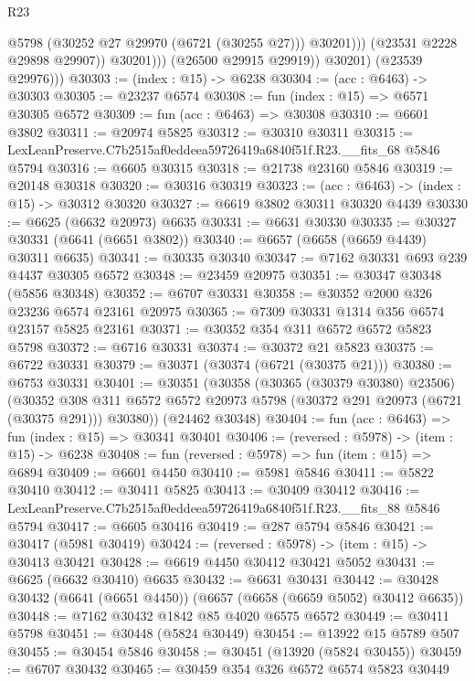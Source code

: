 \begin{lexlean}{R23}
\begin{coremodule}
                          @5798
                          (@30252 @27 @29970 (@6721 (@30255 @27)))
                          @30201)))
                    (@23531 @2228 @29898 @29907))
                  @30201)))
            (@26500 @29915 @29919))
          @30201)
        (@23539 @29976)))
@30303 := (index : @15) -> @6238
@30304 := (acc : @6463) -> @30303
@30305 := @23237 @6574
@30308 := fun (index : @15) => @6571 @30305 @6572
@30309 := fun (acc : @6463) => @30308
@30310 := @6601 @3802
@30311 := @20974 @5825
@30312 := @30310 @30311
@30315 := LexLeanPreserve.C7b2515af0eddeea59726419a6840f51f.R23.__fits_68 @5846 @5794
@30316 := @6605 @30315
@30318 := @21738 @23160 @5846
@30319 := @20148 @30318
@30320 := @30316 @30319
@30323 := (acc : @6463) -> (index : @15) -> @30312 @30320
@30327 := @6619 @3802 @30311 @30320 @4439
@30330 := @6625 (@6632 @20973) @6635
@30331 := @6631 @30330
@30335 := @30327 @30331 (@6641 (@6651 @3802))
@30340 := @6657 (@6658 (@6659 @4439) @30311 @6635)
@30341 := @30335 @30340
@30347 := @7162 @30331 @693 @239 @4437 @30305 @6572
@30348 := @23459 @20975
@30351 := @30347 @30348 (@5856 @30348)
@30352 := @6707 @30331
@30358 := @30352 @2000 @326 @23236 @6574 @23161 @20975
@30365 := @7309 @30331 @1314 @356 @6574 @23157 @5825 @23161
@30371 := @30352 @354 @311 @6572 @6572 @5823 @5798
@30372 := @6716 @30331
@30374 := @30372 @21 @5823
@30375 := @6722 @30331
@30379 := @30371 (@30374 (@6721 (@30375 @21)))
@30380 := @6753 @30331
@30401 := @30351
    (@30358
      (@30365 (@30379 @30380) @23506)
      (@30352 @308 @311 @6572 @6572 @20973 @5798 (@30372 @291 @20973 (@6721 (@30375 @291))) @30380))
    (@24462 @30348)
@30404 := fun (acc : @6463) => fun (index : @15) => @30341 @30401
@30406 := (reversed : @5978) -> (item : @15) -> @6238
@30408 := fun (reversed : @5978) => fun (item : @15) => @6894
@30409 := @6601 @4450
@30410 := @5981 @5846
@30411 := @5822 @30410
@30412 := @30411 @5825
@30413 := @30409 @30412
@30416 := LexLeanPreserve.C7b2515af0eddeea59726419a6840f51f.R23.__fits_88 @5846 @5794
@30417 := @6605 @30416
@30419 := @287 @5794 @5846
@30421 := @30417 (@5981 @30419)
@30424 := (reversed : @5978) -> (item : @15) -> @30413 @30421
@30428 := @6619 @4450 @30412 @30421 @5052
@30431 := @6625 (@6632 @30410) @6635
@30432 := @6631 @30431
@30442 := @30428 @30432 (@6641 (@6651 @4450)) (@6657 (@6658 (@6659 @5052) @30412 @6635))
@30448 := @7162 @30432 @1842 @85 @4020 @6575 @6572
@30449 := @30411 @5798
@30451 := @30448 (@5824 @30449)
@30454 := @13922 @15 @5789 @507
@30455 := @30454 @5846
@30458 := @30451 (@13920 (@5824 @30455))
@30459 := @6707 @30432
@30465 := @30459 @354 @326 @6572 @6574 @5823 @30449

\end{coremodule}
\end{lexlean}
